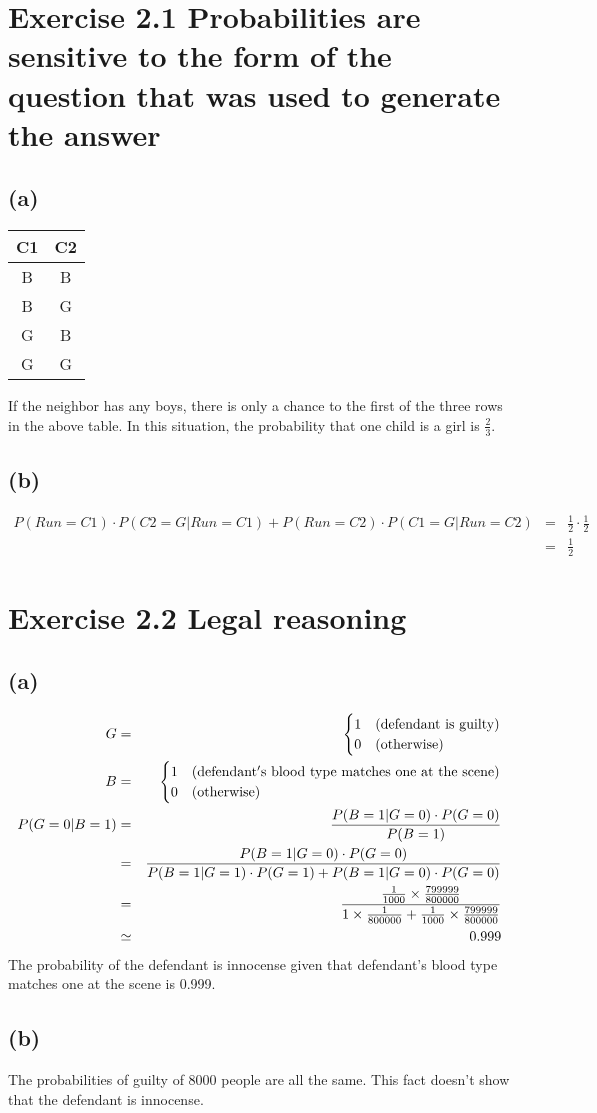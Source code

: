 \documentclass{jsarticle}
\begin{document}
\section*{Exercise 2.1 Probabilities are sensitive to the form of the question that was used to generate the answer}
\subsection*{(a)}
\begin{table}[htbp]
\centering
\begin{tabular}{cc}
C1 & C2 \\ \hline
B & B\\
B & G\\
G & B\\
G & G
\end{tabular}
\end{table}
If the neighbor has any boys, there is only a chance to the first of the three rows in the above table.
In this situation, the probability that one child is a girl is $\frac{2}{3}$.
\subsection*{(b)}
\begin{eqnarray*}
P(Run=C1)\cdot P(C2=G|Run=C1)+P(Run=C2)\cdot P(C1=G|Run=C2) & = & \frac{1}{2}\cdot\frac{1}{2}\\ & = & \frac{1}{2}
\end{eqnarray*}

\section*{Exercise 2.2 Legal reasoning}
\subsection*{(a)}
\begin{eqnarray}
G & = & \begin{cases}
1 & (\rm defendant\ is\ guilty) \\
0 & (\rm otherwise)
\end{cases}\\
B & = & \begin{cases}
1 & (\rm defendant's\ blood\ type\ matches\ one\ at\ the\ scene)\\
0 & (\rm otherwise)
\end{cases}\\
P(G=0|B=1) & = & \frac{P(B=1|G=0)\cdot P(G=0)}{P(B=1)}\\
& = & \frac{P(B=1|G=0)\cdot P(G=0)}{P(B=1|G=1)\cdot P(G=1)+P(B=1|G=0)\cdot P(G=0)}\\
& = & \frac{\frac{1}{1000}\times \frac{799999}{800000}}{1\times \frac{1}{800000} + \frac{1}{1000} \times \frac{799999}{800000}}\\
& \simeq & 0.999
\end{eqnarray}
The probability of the defendant is innocense given that defendant's blood type matches one at the scene is 0.999.
\subsection*{(b)}
The probabilities of guilty of 8000 people are all the same. This fact doesn't show that the defendant is innocense.
\end{document}
